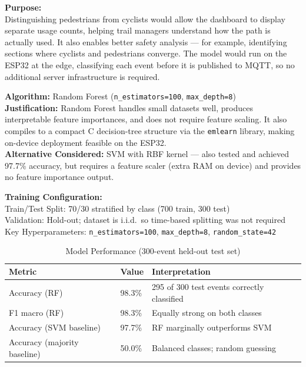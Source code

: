 \documentclass[11pt]{article}
\begin{document}
\noindent\textbf{Purpose:}\\{}
Distinguishing pedestrians from cyclists would allow the dashboard to display separate usage counts, helping trail managers understand how the path is actually used. It also enables better safety analysis --- for example, identifying sections where cyclists and pedestrians converge. The model would run on the ESP32 at the edge, classifying each event before it is published to MQTT, so no additional server infrastructure is required.

\vspace{0.5em}

\noindent\textbf{Algorithm:} Random Forest (\texttt{n\_estimators=100}, \texttt{max\_depth=8})\\
\textbf{Justification:} Random Forest handles small datasets well, produces interpretable feature importances, and does not require feature scaling. It also compiles to a compact C decision-tree structure via the \texttt{emlearn} library, making on-device deployment feasible on the ESP32.\\
\textbf{Alternative Considered:} SVM with RBF kernel --- also tested and achieved 97.7\% accuracy, but requires a feature scaler (extra RAM on device) and provides no feature importance output.

\vspace{0.5em}

\noindent\textbf{Training Configuration:}\\{}
Train/Test Split: 70/30 stratified by class (700 train, 300 test)\\
Validation: Hold-out; dataset is i.i.d.\ so time-based splitting was not required\\
Key Hyperparameters: \texttt{n\_estimators=100}, \texttt{max\_depth=8}, \texttt{random\_state=42}

\vspace{0.5em}

\begin{table}[htbp]
\centering
\caption{Model Performance (300-event held-out test set)}
\label{tab:results}
\begin{tabular}{@{}p{4.5cm}p{2.5cm}p{5cm}@{}}
\toprule
\textbf{Metric} & \textbf{Value} & \textbf{Interpretation} \\
\midrule
Accuracy (RF) & 98.3\% & 295 of 300 test events correctly classified \\
\addlinespace
F1 macro (RF) & 98.3\% & Equally strong on both classes \\
\addlinespace
Accuracy (SVM baseline) & 97.7\% & RF marginally outperforms SVM \\
\addlinespace
Accuracy (majority baseline) & 50.0\% & Balanced classes; random guessing \\
\bottomrule
\end{tabular}
\end{table}
\end{document}
